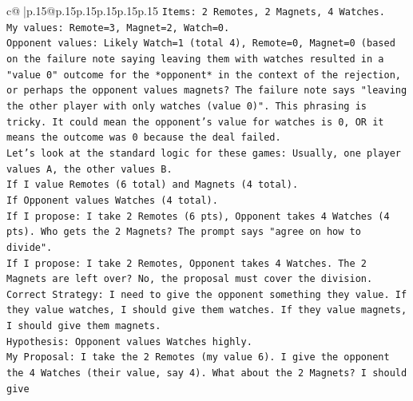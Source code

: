\documentclass{article}
\begin{document}
{\begin{supertabular}{c@{$\;$}|p{.15\linewidth}@{}p{.15\linewidth}p{.15\linewidth}p{.15\linewidth}p{.15\linewidth}p{.15\linewidth}}
{{{\texttt{Items: 2 Remotes, 2 Magnets, 4 Watches.} \\
\texttt{My values: Remote=3, Magnet=2, Watch=0.} \\
\texttt{Opponent values: Likely Watch=1 (total 4), Remote=0, Magnet=0 (based on the failure note saying leaving them with watches resulted in a "value 0" outcome for the *opponent* in the context of the rejection, or perhaps the opponent values magnets? The failure note says "leaving the other player with only watches (value 0)". This phrasing is tricky. It could mean the opponent's value for watches is 0, OR it means the outcome was 0 because the deal failed.} \\
\texttt{Let's look at the standard logic for these games: Usually, one player values A, the other values B.} \\
\texttt{If I value Remotes (6 total) and Magnets (4 total).} \\
\texttt{If Opponent values Watches (4 total).} \\
\texttt{If I propose: I take 2 Remotes (6 pts), Opponent takes 4 Watches (4 pts). Who gets the 2 Magnets? The prompt says "agree on how to divide".} \\
\texttt{If I propose: I take 2 Remotes, Opponent takes 4 Watches. The 2 Magnets are left over? No, the proposal must cover the division.} \\
\texttt{Correct Strategy: I need to give the opponent something they value. If they value watches, I should give them watches. If they value magnets, I should give them magnets.} \\
\texttt{Hypothesis: Opponent values Watches highly.} \\
\texttt{My Proposal: I take the 2 Remotes (my value 6). I give the opponent the 4 Watches (their value, say 4). What about the 2 Magnets? I should give} \\
\\ 
}}}
\end{supertabular}}
\end{document}
